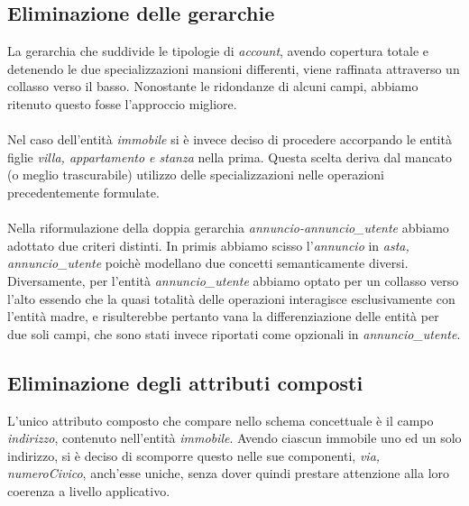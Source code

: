 \documentclass[a4paper,12pt]{report}
\begin{document}
            \subsection*{Eliminazione delle gerarchie}
                La gerarchia che suddivide le tipologie di \textit{account}, avendo copertura totale e
                detenendo le due specializzazioni mansioni differenti, viene raffinata
                attraverso un collasso verso il basso. Nonostante le ridondanze di alcuni campi,
                abbiamo ritenuto questo fosse l'approccio migliore.\\
                \\
                Nel caso dell'entità \textit{immobile} si è invece deciso di procedere accorpando le
                entità figlie \textit{villa, appartamento e stanza} nella prima. Questa scelta deriva
                dal mancato (o meglio trascurabile) utilizzo delle specializzazioni nelle operazioni
                precedentemente formulate.\\
                \\
                Nella riformulazione della doppia gerarchia \textit{annuncio-annuncio\_utente} abbiamo
                adottato due criteri distinti. In primis abbiamo scisso l'\textit{annuncio} in 
                \textit{asta, annuncio\_utente} poichè modellano due concetti semanticamente diversi.
                Diversamente, per l'entità \textit{annuncio\_utente} abbiamo optato per un collasso verso
                l'alto essendo che la quasi totalità delle operazioni interagisce esclusivamente con l'entità 
                madre, e risulterebbe pertanto vana la differenziazione delle entità per due soli campi, che 
                sono stati invece riportati come opzionali in \textit{annuncio\_utente}.


            \subsection*{Eliminazione degli attributi composti}
            L'unico attributo composto che compare nello schema concettuale è il campo \textit{indirizzo},
            contenuto nell'entità \textit{immobile}. Avendo ciascun immobile uno ed un solo indirizzo,
            si è deciso di scomporre questo nelle sue componenti, \textit{via, numeroCivico}, anch'esse uniche, senza dover quindi 
            prestare attenzione alla loro coerenza a livello applicativo.

            \newpage
\end{document}
